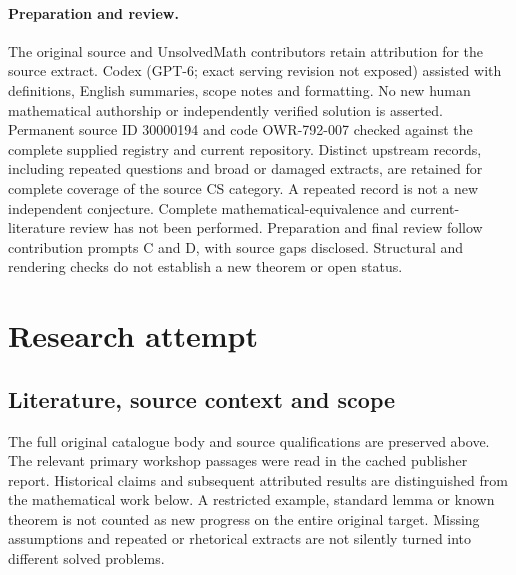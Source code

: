 \documentclass[11pt]{article}
\begin{document}
\paragraph{Preparation and review.}
The original source and UnsolvedMath contributors retain attribution for the source extract. Codex (GPT-6; exact serving revision not exposed) assisted with definitions, English summaries, scope notes and formatting. No new human mathematical authorship or independently verified solution is asserted. Permanent source ID 30000194 and code OWR-792-007 checked against the complete supplied registry and current repository. Distinct upstream records, including repeated questions and broad or damaged extracts, are retained for complete coverage of the source CS category. A repeated record is not a new independent conjecture. Complete mathematical-equivalence and current-literature review has not been performed. Preparation and final review follow contribution prompts C and D, with source gaps disclosed. Structural and rendering checks do not establish a new theorem or open status.
\label{end:30000194}

\section{Research attempt}
\subsection{Literature, source context and scope}
The full original catalogue body and source qualifications are preserved above. The relevant primary workshop passages were read in the cached publisher report. Historical claims and subsequent attributed results are distinguished from the mathematical work below. A restricted example, standard lemma or known theorem is not counted as new progress on the entire original target. Missing assumptions and repeated or rhetorical extracts are not silently turned into different solved problems.
\end{document}
